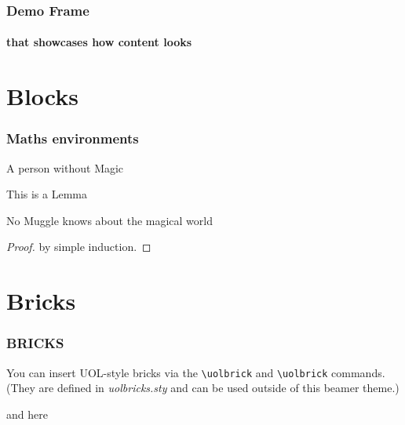 \documentclass[
aspectratio=169,
]{beamer}
\begin{document}
\begin{frame}[t]
    \frametitle{Demo Frame}
    \framesubtitle{that showcases how content looks}

    \democontent 
\end{frame}

\section{Blocks}

\begin{frame}
    \frametitle{Maths environments}

\begin{definition}[Muggle]
A person without Magic
\end{definition}

\begin{lemma}
    This is a Lemma
\end{lemma}
\begin{theorem}
No Muggle knows about the magical world
\end{theorem} 
\begin{proof}
    by simple induction.
\end{proof}

\end{frame}

%

\section{Bricks}
\begin{frame}[fragile]
    \frametitle{BRICKS}
    You can insert UOL-style bricks via the \verb|\uolbrick| and \verb|\uolbrick| commands.\\
    (They are defined in \emph{uolbricks.sty} and can be used outside of this beamer theme.)

    \bigskip
    and here

    \medskip
    {
    \tiny
    }
    {
    \Huge
    }

    \medskip

    \vfill
\end{frame}
\end{document}
